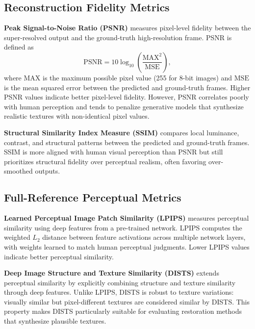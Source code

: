 \subsection{Reconstruction Fidelity Metrics}
\label{subsec:fidelity_metrics}

\textbf{Peak Signal-to-Noise Ratio (PSNR)} measures pixel-level 
fidelity between the super-resolved output and the ground-truth 
high-resolution frame. PSNR is defined as
\begin{equation}
    \mathrm{PSNR} = 10 \log_{10} 
    \left( \frac{\mathrm{MAX}^2}{\mathrm{MSE}} \right),
    \label{eq:psnr}
\end{equation}
where $\mathrm{MAX}$ is the maximum possible pixel value (255 
for 8-bit images) and $\mathrm{MSE}$ is the mean squared error 
between the predicted and ground-truth frames. Higher PSNR 
values indicate better pixel-level fidelity. However, PSNR 
correlates poorly with human perception and tends to penalize 
generative models that synthesize realistic textures with 
non-identical pixel values.

\textbf{Structural Similarity Index Measure (SSIM)} 
\cite{wang2004ssim} compares local luminance, contrast, and 
structural patterns between the predicted and ground-truth 
frames. SSIM is more aligned with human visual perception than 
PSNR but still prioritizes structural fidelity over perceptual 
realism, often favoring over-smoothed outputs.


\subsection{Full-Reference Perceptual Metrics}
\label{subsec:fr_metrics}

\textbf{Learned Perceptual Image Patch Similarity (LPIPS)} 
\cite{zhang2018lpips} measures perceptual similarity using 
deep features from a pre-trained network. LPIPS computes the 
weighted $L_2$ distance between feature activations across 
multiple network layers, with weights learned to match human 
perceptual judgments. Lower LPIPS values indicate better 
perceptual similarity.

\textbf{Deep Image Structure and Texture Similarity (DISTS)} 
\cite{ding2020dists} extends perceptual similarity by 
explicitly combining structure and texture similarity through 
deep features. Unlike LPIPS, DISTS is robust to texture 
variations: visually similar but pixel-different textures are 
considered similar by DISTS. This property makes DISTS 
particularly suitable for evaluating restoration methods that 
synthesize plausible textures.


